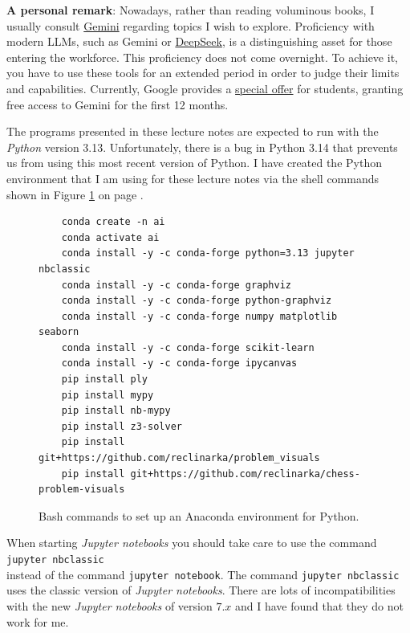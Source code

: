 \noindent
\textbf{A personal remark}:
Nowadays, rather than reading voluminous books, I usually consult \href{https://gemini.google.com}{Gemini}
regarding topics I wish to explore. Proficiency with modern LLMs, such as Gemini or
\href{https://chat.deepseek.com}{DeepSeek}, is a distinguishing asset for those entering the
workforce.  This proficiency does not come overnight.  To achieve it, you have to use these tools
for an extended period in order to judge their limits and capabilities.
Currently, Google provides a \href{https://gemini.google/students/}{special offer} for students,
granting free access to Gemini for the first 12 months.
\pagebreak

\remark
The programs presented in these lecture notes are expected to run with the \textsl{Python} version 3.13.
Unfortunately, there is a bug in Python 3.14 that prevents us from using this most recent version of Python.
I have created the Python environment that I am using for these lecture notes via the shell commands shown in
Figure \ref{fig:ai.sh} on page \pageref{fig:ai.sh}.

\begin{figure}[!ht]
\centering
\begin{verbatim}
    conda create -n ai
    conda activate ai
    conda install -y -c conda-forge python=3.13 jupyter nbclassic
    conda install -y -c conda-forge graphviz
    conda install -y -c conda-forge python-graphviz
    conda install -y -c conda-forge numpy matplotlib seaborn
    conda install -y -c conda-forge scikit-learn 
    conda install -y -c conda-forge ipycanvas 
    pip install ply
    pip install mypy
    pip install nb-mypy
    pip install z3-solver
    pip install git+https://github.com/reclinarka/problem_visuals
    pip install git+https://github.com/reclinarka/chess-problem-visuals
\end{verbatim}
\vspace*{-0.3cm}
\caption{Bash commands to set up an Anaconda environment for Python.}
\label{fig:ai.sh}
\end{figure}

When starting \textsl{Jupyter notebooks} you should take care to use the command
\\[0.2cm]
\hspace*{1.3cm}
\texttt{jupyter nbclassic}
\\[0.2cm]
instead of the command \texttt{jupyter notebook}.  The command \texttt{jupyter nbclassic} uses the classic
version of \textsl{Jupyter notebooks}.  There are lots of incompatibilities with
the new \textsl{Jupyter notebooks} of version $7.x$ and I have found that they do not work for me.
\vspace*{\fill}


